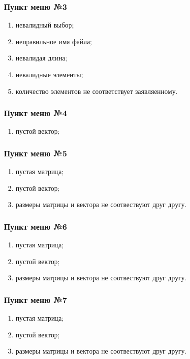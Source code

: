 \documentclass[a4paper,12pt]{extarticle}
\begin{document}
\subsubsection{Пункт меню №3}
\begin{enumerate}
    \item невалидный выбор;
    \item неправильное имя файла;
    \item невалидая длина;
    \item невалидные элементы;
    \item количество элементов не соответствует заявляенному.
\end{enumerate}

\subsubsection{Пункт меню №4}
\begin{enumerate}
    \item пустой вектор;
\end{enumerate}

\subsubsection{Пункт меню №5}
\begin{enumerate}
    \item пустая матрица;
    \item пустой вектор;
    \item размеры матрицы и вектора не соотвествуют друг другу.
\end{enumerate}

\subsubsection{Пункт меню №6}
\begin{enumerate}
    \item пустая матрица;
    \item пустой вектор;
    \item размеры матрицы и вектора не соотвествуют друг другу.
\end{enumerate}

\subsubsection{Пункт меню №7}
\begin{enumerate}
    \item пустая матрица;
    \item пустой вектор;
    \item размеры матрицы и вектора не соотвествуют друг другу.
\end{enumerate}
\end{document}
